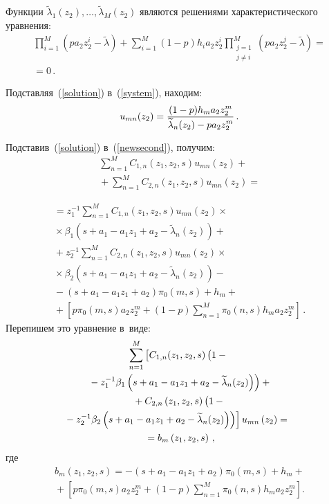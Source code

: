 \begin{multicols}{2}
Функции $\widetilde{\lambda}_1(z_2),\ldots,\widetilde{\lambda}_M(z_2)$ являются 
решениями характеристического уравнения:
\begin{multline}
\prod_{i=1}^M\left(pa_2 z_2^i-\widetilde{\lambda}\right)+
\sum\limits_{i=1}^M(1-p)h_i a_2 z_2^i
\prod\limits_{\substack{j=1\\j\neq i}}^M(pa_2 z_2^j-
\widetilde{\lambda})={}\\
{}=0\,.
\label{determinant}
\end{multline}

Подставляя~(\ref{solution}) в~(\ref{system}), находим:
\begin{equation}
u_{mn}(z_2)=\displaystyle\frac{\displaystyle (1-p)h_m a_2 z_2^m\mathstrut}{\displaystyle \widetilde{\lambda}_n(z_2)-pa_2 z_2^m\mathstrut}\,.
\label{eigenvectors}
\end{equation}

Подставив~(\ref{solution}) в~(\ref{newsecond}), получим:
\begin{multline*}
\sum\limits_{n=1}^{M}C_{1,n}\left(z_1,z_2,s\right)u_{mn}(z_2)+{}\\
{}+
\sum\limits_{n=1}^{M}C_{2,n}\left(z_1,z_2,s\right)u_{mn}(z_2)={}
\end{multline*}

\noindent
\begin{multline*}
{}=z_1^{-1}\sum\limits_{n=1}^{M}C_{1,n}\left(z_1,z_2,s\right)u_{mn}
\left(z_2\right)\times{}\\
{}\times\beta_1\left(s+a_1-a_1 z_1+a_2-\widetilde{\lambda}_n\left(z_2\right)\right)+{}\\
{}+z_2^{-1}\sum\limits_{n=1}^{M}C_{2,n}\left(z_1,z_2,s\right)u_{mn}(z_2)\times{}\\
{}\times \beta_2
\left(s+a_1-a_1 z_1+a_2-\widetilde{\lambda}_n\left(z_2\right)\right)-{}\\
{}-\left(s+a_1-a_1 z_1+a_2\right)
\pi_0(m,s)+h_m+{}\\
{}+\left[p\pi_0(m,s)a_2 z_2^m+(1-p)
\sum\limits_{n=1}^{M}\pi_0(n,s)h_m a_2 z_2^m\right]\,.
\end{multline*}
Перепишем это уравнение в~виде:
\begin{multline}
\sum\limits_{n=1}^{M}\left[
C_{1,n}(z_1,z_2,s)\left(
\vphantom{\tilde{\lambda}_n^{-1}}
1-{}\right.\right.\\
\left.{}-z_1^{-1}\beta_1
\left(s+a_1-a_1 z_1+a_2-\widetilde{\lambda}_n(z_2)\right)\right)+{}\\
{}+C_{2,n}\left(z_1,z_2,s\right)\left(1-
\vphantom{\tilde{\lambda}_n^{-1}}
{}\right.\\
\hspace*{-7.5pt}\left.\left.{}-z_2^{-1}\beta_2
\left(s+a_1-a_1 z_1+a_2-\widetilde{\lambda}_n(z_2)\right)\right)\right]
u_{mn}\left(z_2\right)={}\\
{}=b_m\left(z_1,z_2,s\right)\,,
\label{linear}
\end{multline}
где
\begin{multline*}
\!\!\!\!b_m\!\left(z_1,z_2,s\right)=
-\left(s+a_1-a_1 z_1+a_2\right)\!\pi_0(m,s)+h_m+{}\\
{}+
\left[p\pi_0(m,s)a_2 z_2^m+(1-p)
\sum\limits_{n=1}^{M}\pi_0(n,s)h_m a_2 z_2^m\right].
\end{multline*}


\end{multicols}
